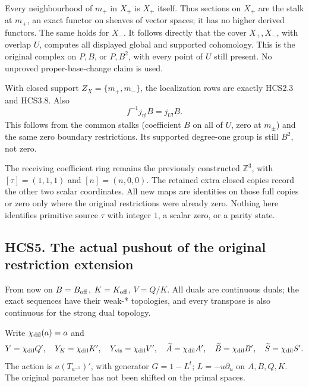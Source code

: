 Every neighbourhood of \(m_+\) in \(X_+\) is \(X_+\) itself. Thus
sections on \(X_+\) are the stalk at \(m_+\), an exact functor on
sheaves of vector spaces; it has no higher derived functors. The same
holds for \(X_-\). It follows directly that the cover \(X_+,X_-\), with
overlap \(U\), computes all displayed global and supported cohomology.
This is the original complex on \(P,B\), or \(P,B^2\), with every point
of \(U\) still present. No unproved proper-base-change claim is used.

With closed support \(Z_X=\{m_+,m_-\}\), the localization rows are
exactly HCS2.3 and HCS3.8. Also \[
f^{-1}j_{\eta!}B=j_{U!}\underline B.
\tag{HCS4.2}
\] This follows from the common stalks (coefficient \(B\) on all of
\(U\), zero at \(m_\pm\)) and the same zero boundary restrictions. Its
supported degree-one group is still \(B^2\), not zero.

The receiving coefficient ring remains the previously constructed
\(\mathbb Z^3\), with \([\tau]=(1,1,1)\) and \([n]=(n,0,0)\). The
retained extra closed copies record the other two scalar coordinates.
All new maps are identities on those full copies or zero only where the
original restrictions were already zero. Nothing here identifies
primitive source \(\tau\) with integer \(1\), a scalar zero, or a parity
state.

\subsection{HCS5. The actual pushout of the original restriction
extension}\label{hcs5.-the-actual-pushout-of-the-original-restriction-extension}

From now on \(B=B_{\rm off}\), \(K=K_{\rm off}\), \(V=Q/K\). All duals
are continuous duals; the exact sequences have their weak-* topologies,
and every transpose is also continuous for the strong dual topology.

Write \(\chi_{\rm dil}(a)=a\) and \[
Y=\chi_{\rm dil}Q',\quad
Y_K=\chi_{\rm dil}K',\quad
Y_{\rm vis}=\chi_{\rm dil}V',\quad
\widetilde A=\chi_{\rm dil}A',\quad
\widetilde B=\chi_{\rm dil}B',\quad
\widetilde S=\chi_{\rm dil}S'.
\] The action is \(a(T_{a^{-1}})'\), with generator \(G=1-L^t\);
\(L=-u\partial_u\) on \(A,B,Q,K\). The original parameter has not been
shifted on the primal spaces.

